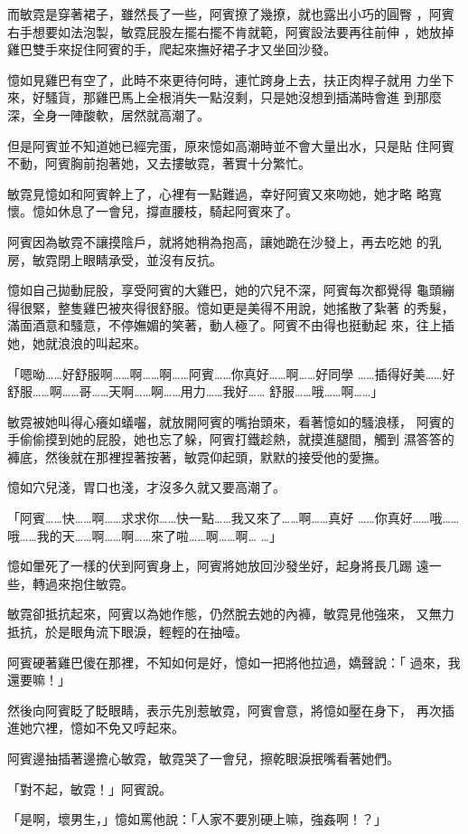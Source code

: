 而敏霓是穿著裙子，雖然長了一些，阿賓撩了幾撩，就也露出小巧的圓臀
，阿賓右手想要如法泡製，敏霓屁股左擺右擺不肯就範，阿賓設法要再往前伸
，她放掉雞巴雙手來捉住阿賓的手，爬起來撫好裙子才又坐回沙發。

憶如見雞巴有空了，此時不來更待何時，連忙跨身上去，扶正肉桿子就用
力坐下來，好騷貨，那雞巴馬上全根消失一點沒剩，只是她沒想到插滿時會進
到那麼深，全身一陣酸軟，居然就高潮了。

但是阿賓並不知道她已經完蛋，原來憶如高潮時並不會大量出水，只是貼
住阿賓不動，阿賓胸前抱著她，又去摟敏霓，著實十分繁忙。

敏霓見憶如和阿賓幹上了，心裡有一點難過，幸好阿賓又來吻她，她才略
略寬懷。憶如休息了一會兒，撐直腰枝，騎起阿賓來了。

阿賓因為敏霓不讓摸陰戶，就將她稍為抱高，讓她跪在沙發上，再去吃她
的乳房，敏霓閉上眼睛承受，並沒有反抗。

憶如自己拋動屁股，享受阿賓的大雞巴，她的穴兒不深，阿賓每次都覺得
龜頭繃得很緊，整隻雞巴被夾得很舒服。憶如更是美得不用說，她搖散了紮著
的秀髮，滿面酒意和騷意，不停嫵媚的笑著，動人極了。阿賓不由得也挺動起
來，往上插她，她就浪浪的叫起來。

「嗯呦……好舒服啊……啊……啊……阿賓……你真好……啊……好同學
……插得好美……好舒服……啊……哥……天啊……啊……用力……我好……
舒服……哦……啊……」

敏霓被她叫得心癢如蟻囓，就放開阿賓的嘴抬頭來，看著憶如的騷浪樣，
阿賓的手偷偷摸到她的屁股，她也忘了躲，阿賓打鐵趁熱，就摸進腿間，觸到
濕答答的褲底，然後就在那裡捏著按著，敏霓仰起頭，默默的接受他的愛撫。

憶如穴兒淺，胃口也淺，才沒多久就又要高潮了。

「阿賓……快……啊……求求你……快一點……我又來了……啊……真好
……你真好……哦……哦……我的天……啊……啊……來了啦……啊……啊…
…」

憶如暈死了一樣的伏到阿賓身上，阿賓將她放回沙發坐好，起身將長几踢
遠一些，轉過來抱住敏霓。

敏霓卻抵抗起來，阿賓以為她作態，仍然脫去她的內褲，敏霓見他強來，
又無力抵抗，於是眼角流下眼淚，輕輕的在抽噎。

阿賓硬著雞巴傻在那裡，不知如何是好，憶如一把將他拉過，嬌聲說：「
過來，我還要嘛！」

然後向阿賓眨了眨眼睛，表示先別惹敏霓，阿賓會意，將憶如壓在身下，
再次插進她穴裡，憶如不免又哼起來。

阿賓邊抽插著邊擔心敏霓，敏霓哭了一會兒，擦乾眼淚抿嘴看著她們。

「對不起，敏霓！」阿賓說。

「是啊，壞男生，」憶如罵他說：「人家不要別硬上嘛，強姦啊！？」

